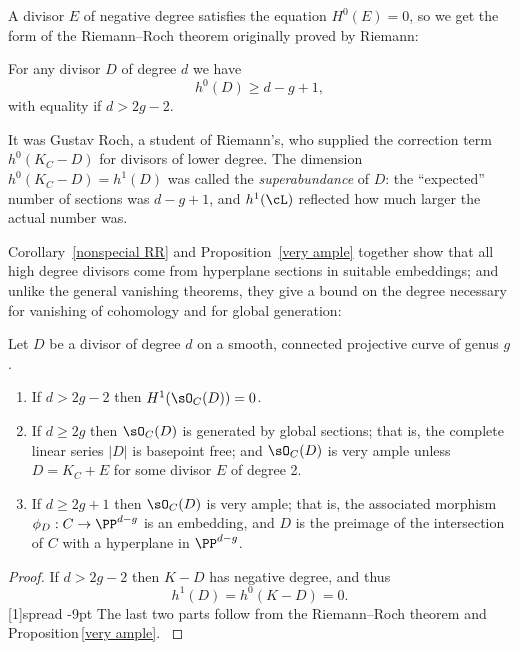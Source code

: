 A divisor $E$
of negative degree 
satisfies the equation
$H^0(E) = 0$,
so we get the form of the Riemann--Roch theorem
originally proved by 
Riemann:
%

\begin{corollary}\label{nonspecial RR}
For any divisor $D$ of degree $d$ we have
$$
h^0(D) \geq d - g + 1,
$$
with equality if $d > 2g-2$.
\unif
\end{corollary}

It was 
Gustav Roch,
%
a student of
Riemann's, 
who supplied the correction term $h^0(K_C - D)$ for divisors of lower degree.
The dimension $h^0(K_C-D) = h^1(D)$ was called the 
\emph{superabundance}
%
of $D$: the ``expected'' number of sections was $d-g+1$, and $h^1(\cL)$ reflected how much larger the actual number was.

Corollary~\ref{nonspecial RR} and Proposition~\ref{very ample} together show that all high degree divisors come from hyperplane sections in 
suitable embeddings; and unlike the general vanishing theorems, they give a bound on the degree necessary for vanishing
of cohomology and for
global generation:

\begin{corollary}\label{degree 2g+1 embedding}
Let $D$ be a divisor of degree $d$ on a smooth, connected projective curve of genus $g$.
\begin{enumerate}
 \item If $d>2g-2$ then $H^1(\sO_C(D)) = 0$.
 \item If $d \geq 2g$ then $\sO_C(D)$ is generated by global sections; that is, the complete linear series $|D|$ is basepoint free; and $\sO_C(D)$ is very ample unless $D = K_{C}+E$ for some divisor $E$ of degree 2.
 \item If $d \geq 2g+1$ then $\sO_C(D)$ is very ample; that is, the associated morphism $\phi_D : C \to \PP^{d-g}$ is an embedding, and
$D$ is the preimage of the intersection of $C$ with a hyperplane in $ \PP^{d-g}$.
\unif
\end{enumerate}
\end{corollary}

\begin{proof}
If $d>2g-2$ then $K-D$ has negative degree, and thus 
$$h^1(D) = h^0(K-D) = 0. $$ 
\scalebox{0.99}[1]{\hbox spread -9pt{%
The last two parts follow
from the Riemann--Roch theorem and Proposition\,\ref{very ample}.
\unskip}}
\end{proof}

